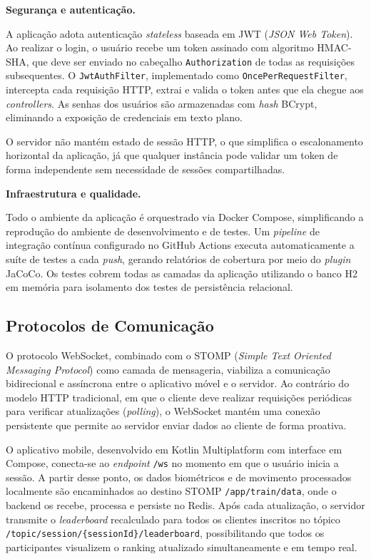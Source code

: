 \vspace{0.2cm}
\noindent\textbf{Segurança e autenticação.}
\vspace{0.2cm}

A aplicação adota autenticação \textit{stateless} baseada em JWT (\textit{JSON Web Token}). Ao realizar o login, o usuário recebe um token assinado com algoritmo HMAC-SHA, que deve ser enviado no cabeçalho \texttt{Authorization} de todas as requisições subsequentes. O \texttt{JwtAuthFilter}, implementado como \texttt{OncePerRequestFilter}, intercepta cada requisição HTTP, extrai e valida o token antes que ela chegue aos \textit{controllers}. As senhas dos usuários são armazenadas com \textit{hash} BCrypt, eliminando a exposição de credenciais em texto plano.

O servidor não mantém estado de sessão HTTP, o que simplifica o escalonamento horizontal da aplicação, já que qualquer instância pode validar um token de forma independente sem necessidade de sessões compartilhadas.

\vspace{0.2cm}
\noindent\textbf{Infraestrutura e qualidade.}
\vspace{0.2cm}

Todo o ambiente da aplicação é orquestrado via Docker Compose, simplificando a reprodução do ambiente de desenvolvimento e de testes. Um \textit{pipeline} de integração contínua configurado no GitHub Actions executa automaticamente a suíte de testes a cada \textit{push}, gerando relatórios de cobertura por meio do \textit{plugin} JaCoCo. Os testes cobrem todas as camadas da aplicação utilizando o banco H2 em memória para isolamento dos testes de persistência relacional.

\subsection{Protocolos de Comunicação}

O protocolo WebSocket, combinado com o STOMP (\textit{Simple Text Oriented Messaging Protocol}) como camada de mensageria, viabiliza a comunicação bidirecional e assíncrona entre o aplicativo móvel e o servidor. Ao contrário do modelo HTTP tradicional, em que o cliente deve realizar requisições periódicas para verificar atualizações (\textit{polling}), o WebSocket mantém uma conexão persistente que permite ao servidor enviar dados ao cliente de forma proativa.

O aplicativo mobile, desenvolvido em Kotlin Multiplatform com interface em Compose, conecta-se ao \textit{endpoint} \texttt{/ws} no momento em que o usuário inicia a sessão. A partir desse ponto, os dados biométricos e de movimento processados localmente são encaminhados ao destino STOMP \texttt{/app/train/data}, onde o backend os recebe, processa e persiste no Redis. Após cada atualização, o servidor transmite o \textit{leaderboard} recalculado para todos os clientes inscritos no tópico \texttt{/topic/session/\{sessionId\}/leaderboard}, possibilitando que todos os participantes visualizem o ranking atualizado simultaneamente e em tempo real.


